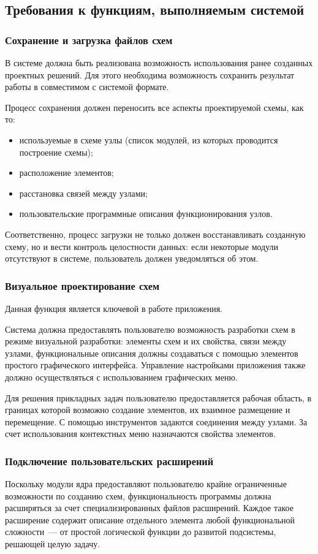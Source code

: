 \subsection{Требования к функциям, выполняемым системой} \label{sec:functions}

\subsubsection{Сохранение и загрузка файлов схем}
В системе должна быть реализована возможность использования ранее созданных проектных решений.
Для этого необходима возможность сохранить результат работы в совместимом с системой формате.

Процесс сохранения должен переносить все аспекты проектируемой схемы, как то:
\begin{itemize}
  \item используемые в схеме узлы (список модулей, из которых проводится построение схемы);
  \item расположение элементов;
  \item расстановка связей между узлами;
  \item пользовательские программные описания функционирования узлов.
\end{itemize}

Соответственно, процесс загрузки не только должен восстанавливать созданную схему, но и вести контроль целостности данных: если некоторые модули отсутствуют в системе, пользователь должен уведомляться об этом.
%
%
\subsubsection{Визуальное проектирование схем}
Данная функция является ключевой в работе приложения.

Система должна предоставлять пользователю возможность разработки схем в режиме визуальной разработки: элементы схем и их свойства, связи между узлами, функциональные описания должны создаваться с помощью элементов простого графического интерфейса.
Управление настройками приложения также должно осуществляться с использованием графических меню.

Для решения прикладных задач пользователю предоставляется рабочая область, в границах которой возможно создание элементов, их взаимное размещение и перемещение.
С помощью инструментов задаются соединения между узлами.
За счет использования контекстных меню назначаются свойства элементов.
%
%
\subsubsection{Подключение пользовательских расширений}
Поскольку модули ядра предоставляют пользователю крайне ограниченные возможности по созданию схем, функциональность программы должна расширяться за счет специализированных файлов расширений.
Каждое такое расширение содержит описание отдельного элемента любой функциональной сложности~--- от простой логической функции до развитой подсистемы, решающей целую задачу.

